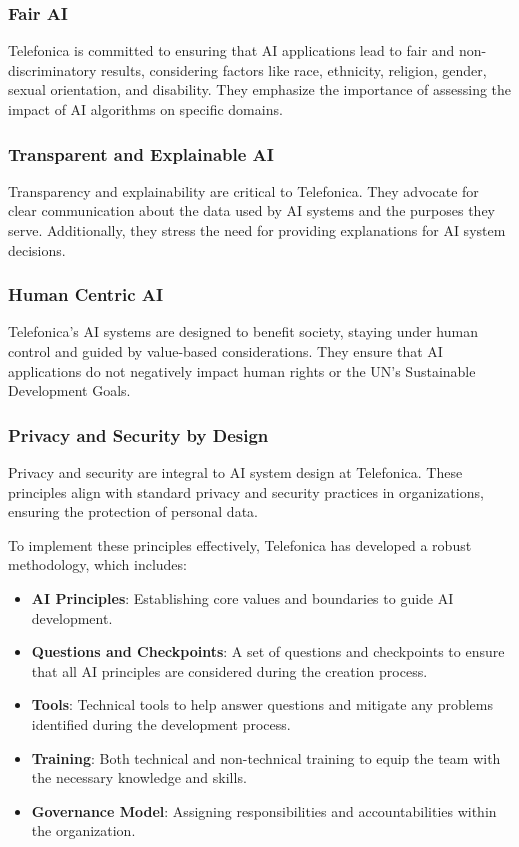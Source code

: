 \documentclass{article}
\begin{document}
\subsubsection{Fair AI}
Telefonica is committed to ensuring that AI applications lead to fair and non-discriminatory results, considering factors like race, ethnicity, religion, gender, sexual orientation, and disability. They emphasize the importance of assessing the impact of AI algorithms on specific domains.

\subsubsection{Transparent and Explainable AI}
Transparency and explainability are critical to Telefonica. They advocate for clear communication about the data used by AI systems and the purposes they serve. Additionally, they stress the need for providing explanations for AI system decisions.

\subsubsection{Human Centric AI}
Telefonica's AI systems are designed to benefit society, staying under human control and guided by value-based considerations. They ensure that AI applications do not negatively impact human rights or the UN's Sustainable Development Goals.

\subsubsection{Privacy and Security by Design}
Privacy and security are integral to AI system design at Telefonica. These principles align with standard privacy and security practices in organizations, ensuring the protection of personal data.

To implement these principles effectively, Telefonica has developed a robust methodology, which includes:
\begin{itemize}
    \item \textbf{AI Principles}: Establishing core values and boundaries to guide AI development.
    \item \textbf{Questions and Checkpoints}: A set of questions and checkpoints to ensure that all AI principles are considered during the creation process.
    \item \textbf{Tools}: Technical tools to help answer questions and mitigate any problems identified during the development process.
    \item \textbf{Training}: Both technical and non-technical training to equip the team with the necessary knowledge and skills.
    \item \textbf{Governance Model}: Assigning responsibilities and accountabilities within the organization.

\end{itemize}
\end{document}
